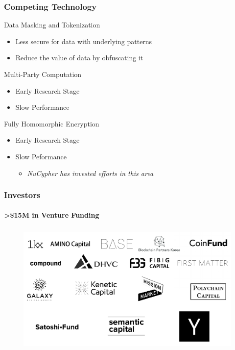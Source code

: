 \documentclass[xetex,mathsans,sans,aspectratio=169]{beamer}
\begin{document}
    \begin{frame}
      \frametitle{Competing Technology}
       Data Masking and Tokenization
       \begin{itemize}
           \item Less secure for data with underlying patterns
           \item Reduce the value of data by obfuscating it
       \end{itemize}

       Multi-Party Computation
       \begin{itemize}
           \item Early Research Stage
           \item Slow Performance
       \end{itemize}
      
       Fully Homomorphic Encryption
       \begin{itemize}
           \item Early Research Stage
           \item Slow Peformance
           \begin{itemize}
               \item \emph{NuCypher has invested efforts in this area}
           \end{itemize}
       \end{itemize}
       
     \end{frame}
    
    \begin{frame}
      \frametitle{Investors}
        \framesubtitle{>\$15M in Venture Funding}
        \begin{figure}
            \centering
            \includegraphics[height=6.5cm]{pdf/investors.pdf}
        \end{figure}
    \end{frame}
\end{document}
